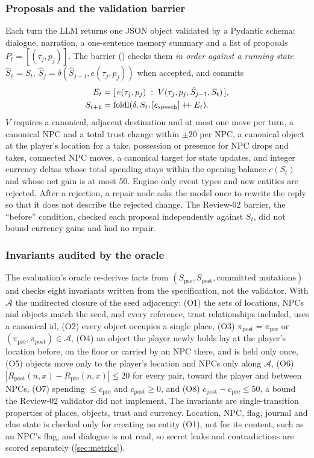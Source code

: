 \documentclass[letterpaper,journal]{IEEEtran}
\begin{document}
\subsubsection{Proposals and the validation barrier}
Each turn the LLM returns one JSON object validated by a Pydantic schema: dialogue, narration, a one-sentence memory summary and a list of proposals $P_t=[(\tau_j,p_j)]$. The barrier () checks them \emph{in order against a running state} $\hat S_0=S_t$, $\hat S_j=\delta(\hat S_{j-1},e(\tau_j,p_j))$ when accepted, and commits
\begin{equation}\label{eq:commit}
\begin{aligned}
E_t&=[\,e(\tau_j,p_j)\;:\;V(\tau_j,p_j,\hat S_{j-1},S_t)\,],\\
S_{t+1}&=\operatorname{foldl}(\delta,S_t,[e_{\text{speech}}]\mathbin{+\!\!+}E_t).
\end{aligned}
\end{equation}
$V$ requires a canonical, adjacent destination and at most one move per turn, a canonical NPC and a total trust change within $\pm20$ per NPC, a canonical object at the player's location for a take, possession or presence for NPC drops and takes, connected NPC moves, a canonical target for state updates, and integer currency deltas whose total spending stays within the opening balance $c(S_t)$ and whose net gain is at most 50. Engine-only event types and new entities are rejected. After a rejection, a repair node asks the model once to rewrite the reply so that it does not describe the rejected change. The Review-02 barrier, the ``before'' condition, checked each proposal independently against $S_t$, did not bound currency gains and had no repair.

\subsubsection{Invariants audited by the oracle}\label{sec:oracle}
The evaluation's oracle re-derives facts from $(S_{\text{pre}},S_{\text{post}},\text{committed mutations})$ and checks eight invariants written from the specification, not the validator. With $\mathcal{A}$ the undirected closure of the seed adjacency: (O1) the sets of locations, NPCs and objects match the seed, and every reference, trust relationships included, uses a canonical id, (O2) every object occupies a single place, (O3) $\pi_{\text{post}}=\pi_{\text{pre}}$ or $(\pi_{\text{pre}},\pi_{\text{post}})\in\mathcal{A}$, (O4) an object the player newly holds lay at the player's location before, on the floor or carried by an NPC there, and is held only once, (O5) objects move only to the player's location and NPCs only along $\mathcal{A}$, (O6) $|R_{\text{post}}(n,x)-R_{\text{pre}}(n,x)|\le 20$ for every pair, toward the player and between NPCs, (O7) spending $\le c_{\text{pre}}$ and $c_{\text{post}}\ge 0$, and (O8) $c_{\text{post}}-c_{\text{pre}}\le 50$, a bound the Review-02 validator did not implement. The invariants are single-transition properties of places, objects, trust and currency. Location, NPC, flag, journal and clue state is checked only for creating no entity (O1), not for its content, such as an NPC's  flag, and dialogue is not read, so secret leaks and contradictions are scored separately (\cref{sec:metrics}).
\end{document}
